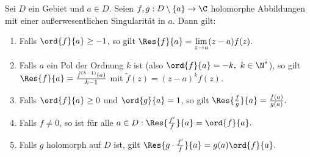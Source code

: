 		\begin{prop}
			Sei $D$ ein Gebiet und $a \in D$. Seien $ f,g: D\setminus\{a\} \to \C $ holomorphe Abbildungen mit einer außerwesentlichen Singularität in $a$. Dann gilt:
			\begin{enumerate}[label={\alph*})]
				\item Falls $ \ord{f}{a} \geq -1 $, so gilt $ \Res{f}{a} = \lim\limits_{z \to a} (z-a)f(z). $
				\item Falls $a$ ein Pol der Ordnung $k$ ist (also $\ord{f}{a} = -k,\ k \in \N^*$), so gilt $ \Res{f}{a} = \frac{\tilde{f}^{(k-1)}(a)}{k-1} $ mit $\tilde{f}(z) = (z-a)^kf(z)$.
				\item Falls $\ord{f}{a} \geq 0$ und $\ord{g}{a} = 1$, so gilt $ \Res{\frac{f}{g}}{a} = \frac{f(a)}{g(a)}. $
				\item Falls $f \neq 0$, so ist für alle $a \in D: \Res{\frac{f'}{f}}{a} = \ord{f}{a}. $
				\item Falls $g$ holomorph auf $D$ ist, gilt $ \Res{g \cdot \frac{f'}{f}}{a} = g(a)\ord{f}{a}. $
			\end{enumerate}
		\end{prop}